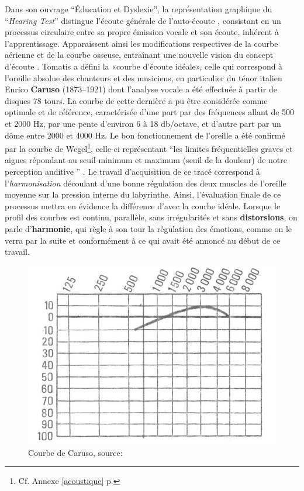 Dans son ouvrage ``Éducation et
    Dyslexie''\autocite {tomatis:education}, la représentation graphique du
 ``\emph {Hearing Test}'' distingue l'écoute générale de
 l'auto-écoute \autocite {Tomatislangage}, consistant  en un processus
   circulaire entre sa propre  émission vocale et son écoute, inhérent
   à l'apprentissage.
 Apparaissent ainsi les modifications respectives
 de la courbe aérienne et de la courbe osseuse, entraînant une nouvelle vision
 du concept d'écoute \autocite {tomatis_conf}.%
       Tomatis a défini la «courbe d'écoute idéale», celle qui correspond à l'oreille absolue
des chanteurs et des musiciens, en particulier du ténor italien Enrico
\textbf{Caruso} (1873--1921) dont l'analyse vocale a été effectuée à partir de
disques 78 tours. La courbe de cette dernière a pu être considérée comme
optimale et de référence, caractérisée d'une part par des fréquences allant de 500 et 2000
Hz, par une pente d\textquoteright environ 6 à 18 db/octave,
et d'autre part par un dôme entre 2000 et 4000 Hz.
Le bon fonctionnement de l'oreille a été confirmé par la courbe
de Wegel\footnote{Cf. Annexe \ref{acoustique} p. \pageref{acoustique}}, celle-ci représentant   \enquote 
{les limites fréquentielles graves et 
aigues répondant au seuil 
minimum et maximum (seuil de la douleur) de notre perception auditive } 
\autocite{Tomatislangage}.
 Le travail d'acquisition de ce tracé correspond à l'\textsl{harmonisation}
découlant d'une bonne régulation des deux muscles de l'oreille moyenne
sur la pression interne du
labyrinthe.
Ainsi, l'évaluation finale de ce processus mettra en évidence la différence
d'avec la courbe idéale.
Lorsque le profil des
courbes est continu, parallèle, sans irrégularités et sans
\textbf{distorsions}, on parle d'\textbf{harmonie}, qui règle à son tour
la régulation des émotions, comme on le verra par la suite et conformément à
ce qui avait été annoncé au début de ce travail.
\begin{center}
	\begin{figure}
		\includegraphics[width=0.7\linewidth]{images/graphiques/courbecarusoideale}	
		\caption{Courbe de Caruso, source: \autocite{Tomatislangage} }
	\end{figure}	
\end{center}
